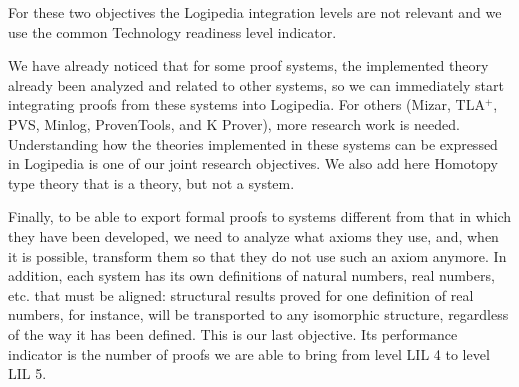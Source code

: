For these two objectives the Logipedia integration levels are not
relevant and we use the common Technology readiness level indicator.

We have already noticed that for some proof systems, the implemented
theory already been analyzed and related to other systems, so we can
immediately start integrating proofs from these systems into
Logipedia. For others (Mizar, TLA$^+$, PVS, Minlog, ProvenTools, and
K Prover), more research work is needed. Understanding how the
theories implemented in these systems can be expressed in Logipedia is
one of our joint research objectives.  We also add here Homotopy type
theory that is a theory, but not a system.

Finally, to be able to export formal proofs to systems different from
that in which they have been developed, we need to analyze what axioms
they use, and, when it is possible, transform them so that they do not
use such an axiom anymore.  In addition, each system has its own
definitions of natural numbers, real numbers, etc. that must be
aligned: structural results proved for one definition of real numbers,
for instance, will be transported to any isomorphic structure,
regardless of the way it has been defined. This is our last objective.
Its performance indicator is the number of proofs we are able to
bring from level LIL 4 to level LIL 5.

